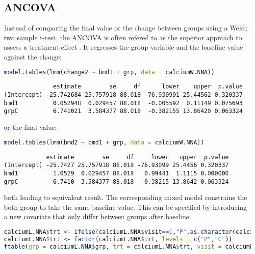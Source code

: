 \documentclass[12pt]{article}
\begin{document}
\clearpage
\subsection{ANCOVA}
\label{sec:orgca1c522}

Instead of comparing the final value or the change between groups
using a Welch two sample t-test, the ANCOVA is often refered to as the
superior approach to assess a treatment effect
\citep{vickers2001analysing}. It regresses the group variable and the
baseline value against the change:

\begin{lstlisting}[language=r,numbers=none]
model.tables(lmm(change2 ~ bmd1 + grp, data = calciumW.NNA))
\end{lstlisting}

\label{}
\begin{verbatim}
              estimate        se     df      lower    upper  p.value
(Intercept) -25.742684 25.757918 88.018 -76.930991 25.44562 0.320337
bmd1          0.052948  0.029457 88.018  -0.005592  0.11149 0.075693
grpC          6.741021  3.584377 88.018  -0.382155 13.86420 0.063324
\end{verbatim}


or the final value:
\begin{lstlisting}[language=r,numbers=none]
model.tables(lmm(bmd2 ~ bmd1 + grp, data = calciumW.NNA))
\end{lstlisting}

\label{}
\begin{verbatim}
            estimate        se     df     lower   upper  p.value
(Intercept) -25.7427 25.757918 88.018 -76.93099 25.4456 0.320337
bmd1          1.0529  0.029457 88.018   0.99441  1.1115 0.000000
grpC          6.7410  3.584377 88.018  -0.38215 13.8642 0.063324
\end{verbatim}


both leading to equivalent result. The corresponding mixed model
constrains the both group to take the same baseline value. This can be
specified by introducing a new covariate that only differ between
groups after baseline:
\begin{lstlisting}[language=r,numbers=none]
calciumL.NNA$trt <- ifelse(calciumL.NNA$visit==1,"P",as.character(calciumL.NNA$grp))
calciumL.NNA$trt <- factor(calciumL.NNA$trt, levels = c("P","C"))
ftable(grp = calciumL.NNA$grp, trt = calciumL.NNA$trt, visit = calciumL.NNA$visit)
\end{lstlisting}
\end{document}
